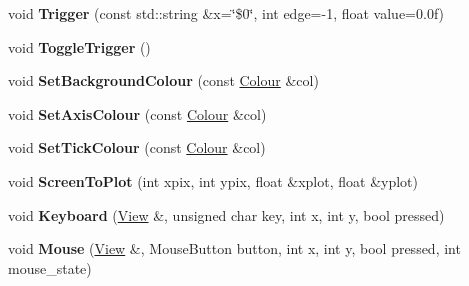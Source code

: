 \begin{DoxyCompactItemize}
\item 
void {\bfseries Trigger} (const std\+::string \&x=\char`\"{}\$0\char`\"{}, int edge=-\/1, float value=0.\+0f)\hypertarget{classpangolin_1_1_plotter_a916d24daeb2deeaceac3c5d30969a465}{}\label{classpangolin_1_1_plotter_a916d24daeb2deeaceac3c5d30969a465}

\item 
void {\bfseries Toggle\+Trigger} ()\hypertarget{classpangolin_1_1_plotter_a227905026d2c5d11103aed6501644442}{}\label{classpangolin_1_1_plotter_a227905026d2c5d11103aed6501644442}

\item 
void {\bfseries Set\+Background\+Colour} (const \hyperlink{structpangolin_1_1_colour}{Colour} \&col)\hypertarget{classpangolin_1_1_plotter_a9b7dc1f6ad99184a17df4f0c38926d19}{}\label{classpangolin_1_1_plotter_a9b7dc1f6ad99184a17df4f0c38926d19}

\item 
void {\bfseries Set\+Axis\+Colour} (const \hyperlink{structpangolin_1_1_colour}{Colour} \&col)\hypertarget{classpangolin_1_1_plotter_acbe05289d8a2c828a7341464d5bfaad2}{}\label{classpangolin_1_1_plotter_acbe05289d8a2c828a7341464d5bfaad2}

\item 
void {\bfseries Set\+Tick\+Colour} (const \hyperlink{structpangolin_1_1_colour}{Colour} \&col)\hypertarget{classpangolin_1_1_plotter_adf86fd9b57493dedb5152782b393a725}{}\label{classpangolin_1_1_plotter_adf86fd9b57493dedb5152782b393a725}

\item 
void {\bfseries Screen\+To\+Plot} (int xpix, int ypix, float \&xplot, float \&yplot)\hypertarget{classpangolin_1_1_plotter_ad2b85eaacfe5e6286ee5fa50122cf8f6}{}\label{classpangolin_1_1_plotter_ad2b85eaacfe5e6286ee5fa50122cf8f6}

\item 
void {\bfseries Keyboard} (\hyperlink{structpangolin_1_1_view}{View} \&, unsigned char key, int x, int y, bool pressed)\hypertarget{classpangolin_1_1_plotter_a960784ab9d53f766a06da91a6cc53870}{}\label{classpangolin_1_1_plotter_a960784ab9d53f766a06da91a6cc53870}

\item 
void {\bfseries Mouse} (\hyperlink{structpangolin_1_1_view}{View} \&, Mouse\+Button button, int x, int y, bool pressed, int mouse\+\_\+state)\hypertarget{classpangolin_1_1_plotter_aa4818365d7227a1230e472df4c1394ad}{}\label{classpangolin_1_1_plotter_aa4818365d7227a1230e472df4c1394ad}


\end{DoxyCompactItemize}
